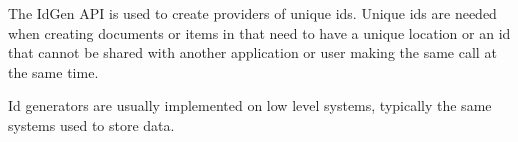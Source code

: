 The IdGen API is used to create providers of unique ids. Unique ids are needed when
creating documents or items in \Rapture that need to have a unique location or an id that
cannot be shared with another application or user making the same call at the same time.

Id generators are usually implemented on low level systems, typically the same systems used
to store data.
